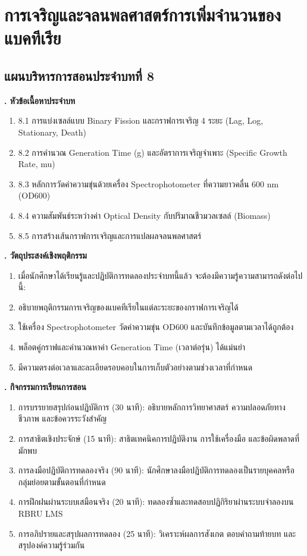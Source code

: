 \chapter{การเจริญและจลนพลศาสตร์การเพิ่มจำนวนของแบคทีเรีย}
\label{chap:ch08}

\section*{แผนบริหารการสอนประจำบทที่ 8}

\noindent\textbf{. หัวข้อเนื้อหาประจำบท}

\begin{enumerate}
    \item 8.1 การแบ่งเซลล์แบบ Binary Fission และกราฟการเจริญ 4 ระยะ (Lag, Log, Stationary, Death)
    \item 8.2 การคำนวณ Generation Time (g) และอัตราการเจริญจำเพาะ (Specific Growth Rate, mu)
    \item 8.3 หลักการวัดค่าความขุ่นด้วยเครื่อง Spectrophotometer ที่ความยาวคลื่น 600 nm (OD600)
    \item 8.4 ความสัมพันธ์ระหว่างค่า Optical Density กับปริมาณชีวมวลเซลล์ (Biomass)
    \item 8.5 การสร้างเส้นกราฟการเจริญและการแปลผลจลนพลศาสตร์
\end{enumerate}

\noindent\textbf{. วัตถุประสงค์เชิงพฤติกรรม}

\begin{enumerate}
    \item เมื่อนักศึกษาได้เรียนรู้และปฏิบัติการทดลองประจำบทนี้แล้ว จะต้องมีความรู้ความสามารถดังต่อไปนี้:
    \item อธิบายพฤติกรรมการเจริญของแบคทีเรียในแต่ละระยะของกราฟการเจริญได้
    \item ใช้เครื่อง Spectrophotometer วัดค่าความขุ่น OD600 และบันทึกข้อมูลตามเวลาได้ถูกต้อง
    \item พล็อตคู่กราฟและคำนวณหาค่า Generation Time (เวลาต่อรุ่น) ได้แม่นยำ
    \item มีความตรงต่อเวลาและละเอียดรอบคอบในการเก็บตัวอย่างตามช่วงเวลาที่กำหนด
\end{enumerate}

\noindent\textbf{. กิจกรรมการเรียนการสอน}

\begin{enumerate}
    \item การบรรยายสรุปก่อนปฏิบัติการ (30 นาที): อธิบายหลักการวิทยาศาสตร์ ความปลอดภัยทางชีวภาพ และข้อควรระวังสำคัญ
    \item การสาธิตเชิงประจักษ์ (15 นาที): สาธิตเทคนิคการปฏิบัติงาน การใช้เครื่องมือ และข้อผิดพลาดที่มักพบ
    \item การลงมือปฏิบัติการทดลองจริง (90 นาที): นักศึกษาลงมือปฏิบัติการทดลองเป็นรายบุคคลหรือกลุ่มย่อยตามขั้นตอนที่กำหนด
    \item การฝึกฝนผ่านระบบเสมือนจริง (20 นาที): ทดลองซ้ำและทดสอบปฏิกิริยาผ่านระบบจำลองบน RBRU LMS
    \item การอภิปรายและสรุปผลการทดลอง (25 นาที): วิเคราะห์ผลการสังเกต ตอบคำถามท้ายบท และสรุปองค์ความรู้ร่วมกัน
\end{enumerate}

